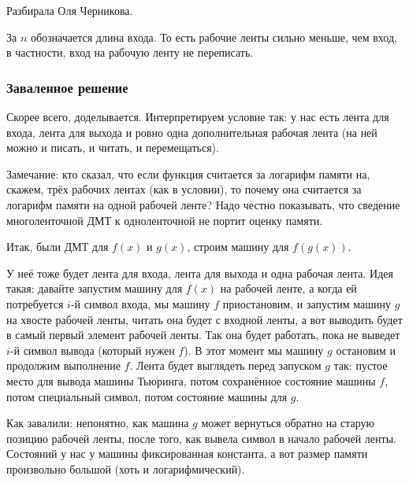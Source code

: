 	Разбирала Оля Черникова.

	За $n$ обозначается длина входа.
	То есть рабочие ленты сильно меньше, чем вход, в частности,
	вход на рабочую ленту не переписать.

	\subsubsection{Заваленное решение}
	Скорее всего, доделывается.
	Интерпретируем условие так: у нас есть лента для входа, лента для выхода и ровно одна дополнительная
	рабочая лента (на ней можно и писать, и читать, и перемещаться).
	\begin{Rem}
		Замечание: кто сказал, что если функция считается за логарифм памяти на, скажем, трёх рабочих лентах (как в условии),
		то почему она считается за логарифм памяти на одной рабочей ленте?
		Надо честно показывать, что сведение многоленточной ДМТ к одноленточной не портит оценку памяти.
	\end{Rem}
	Итак, были ДМТ для $f(x)$ и $g(x)$, строим машину для $f(g(x))$.
	
	У неё тоже будет лента для входа, лента для выхода и одна рабочая лента.
	Идея такая: давайте запустим машину для $f(x)$ на рабочей ленте, а когда ей потребуется
	$i$-й символ входа, мы машину $f$ приостановим, и запустим машину $g$ на хвосте рабочей
	ленты, читать она будет с входной ленты, а вот выводить будет в самый первый элемент рабочей ленты.
	Так она будет работать, пока не выведет $i$-й символ вывода (который нужен $f$).
	В этот момент мы машину $g$ остановим и продолжим выполнение $f$.
	Лента будет выглядеть перед запуском $g$ так: пустое место для вывода машины Тьюринга,
	потом сохранённое состояние машины $f$, потом специальный символ, потом состояние машины для $g$.

	Как завалили: непонятно, как машина $g$ может вернуться обратно на старую позицию рабочей ленты,
	после того, как вывела символ в начало рабочей ленты.
	Состояний у нас у машины фиксированная константа, а вот размер памяти произвольно большой (хоть и логарифмический).

